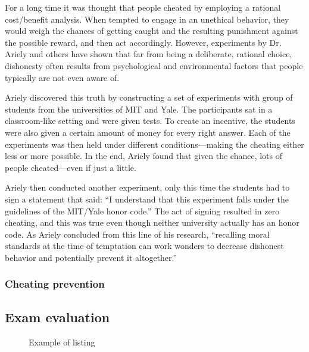 \documentclass[thesis=M,english,hidelinks]{FITthesis}[2012/10/20]
\begin{document}
For a long time it was thought that people cheated by employing a rational cost/benefit analysis. When tempted to engage in an unethical behavior, they would weigh the chances of getting caught and the resulting punishment against the possible reward, and then act accordingly. However, experiments by Dr. Ariely and others have shown that far from being a deliberate, rational choice, dishonesty often results from psychological and environmental factors that people typically are not even aware of.

Ariely discovered this truth by constructing a set of experiments with group of students from the universities of MIT and Yale. The participants sat in a classroom-like setting and were given tests. To create an incentive, the students were also given a certain amount of money for every right answer. Each of the experiments was then held under different conditions---making the cheating either less or more possible. In the end, Ariely found that given the chance, lots of people cheated---even if just a little.

Ariely then conducted another experiment, only this time the students had to sign a statement that said: ``I understand that this experiment falls under the guidelines of the MIT/Yale honor code.'' The act of signing resulted in zero cheating, and this was true even though neither university actually has an honor code. As Ariely concluded from this line of his research, ``recalling moral standards at the time of temptation can work wonders to decrease dishonest behavior and potentially prevent it altogether.''

      \subsubsection{Cheating prevention}



    \subsection{Exam evaluation}

\begin{figure}
  \setlength\fboxsep{0pt}
  \setlength\fboxrule{0.2pt}
  \caption{Example of listing}
  \label{fig:listing}
\end{figure}
\end{document}
